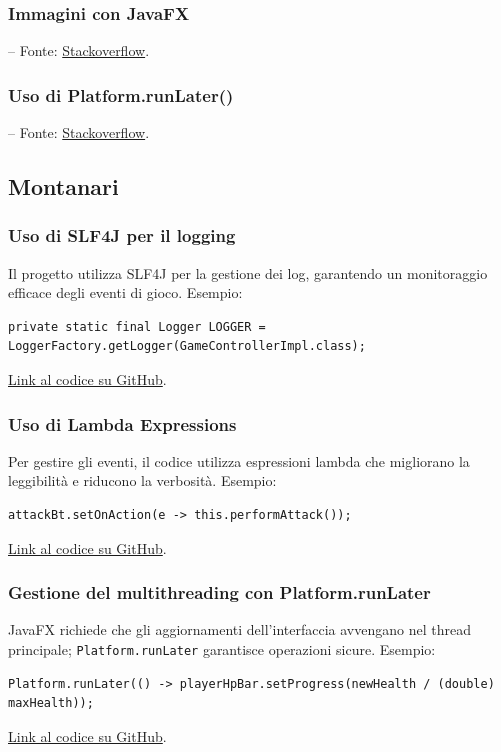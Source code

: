 \documentclass[a4paper,12pt]{report}
\begin{document}
\subsubsection{Immagini con JavaFX} – Fonte: \href{https://stackoverflow.com/questions/52229984/javafx-imageview-actions}{Stackoverflow}.
\subsubsection{Uso di Platform.runLater()} – Fonte: \href{https://stackoverflow.com/questions/13784333/platform-runlater-and-task-in-javafx}{Stackoverflow}.

\subsection{Montanari}
\subsubsection{Uso di SLF4J per il logging}
Il progetto utilizza SLF4J per la gestione dei log, garantendo un monitoraggio efficace degli eventi di gioco.\newline
Esempio:
\begin{verbatim}
private static final Logger LOGGER = LoggerFactory.getLogger(GameControllerImpl.class);
\end{verbatim}
\href{https://github.com/}{Link al codice su GitHub}.

\subsubsection{Uso di Lambda Expressions}
Per gestire gli eventi, il codice utilizza espressioni lambda che migliorano la leggibilità e riducono la verbosità.\newline
Esempio:
\begin{verbatim}
attackBt.setOnAction(e -> this.performAttack());
\end{verbatim}
\href{https://github.com/}{Link al codice su GitHub}.

\subsubsection{Gestione del multithreading con Platform.runLater}
JavaFX richiede che gli aggiornamenti dell'interfaccia avvengano nel thread principale; \texttt{Platform.runLater} garantisce operazioni sicure.\newline
Esempio:
\begin{verbatim}
Platform.runLater(() -> playerHpBar.setProgress(newHealth / (double) maxHealth));
\end{verbatim}
\href{https://github.com/}{Link al codice su GitHub}.
\end{document}
